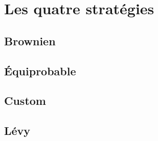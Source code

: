 \section{Les quatre stratégies}
\subsection{Brownien}
\subsection{\'{E}quiprobable}
\subsection{Custom}
\subsection{Lévy}